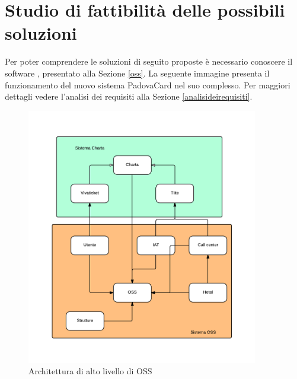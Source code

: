 \section{Studio di fattibilità delle possibili soluzioni}
Per poter comprendere le soluzioni di seguito proposte è necessario conoscere il software , presentato alla Sezione \ref{oss}.
La seguente immagine presenta il funzionamento del nuovo sistema PadovaCard nel suo complesso.
Per maggiori dettagli vedere l'analisi dei requisiti alla Sezione \ref{analisideirequisiti}.
\begin{figure}[H]
\centering
\includegraphics[width=0.9\textwidth]{images/Schema_introduttivo.png}
\caption{Architettura di alto livello di OSS}
\end{figure}

